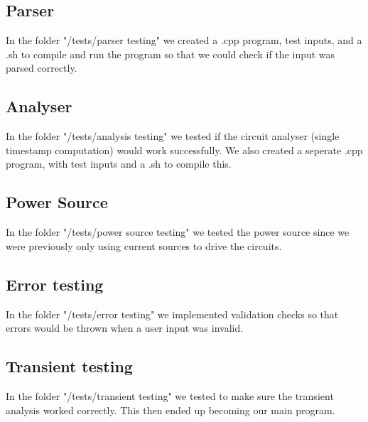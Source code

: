 \documentclass[12pt,a4paper]{article}
\begin{document}
\subsection{Parser}
In the folder "/tests/parser testing" we created a .cpp program, test inputs, and a .sh to compile and run the program so that we 
could check if the input was parsed correctly.
\subsection{Analyser}
In the folder "/tests/analysis testing" we tested if the circuit analyser (single timestamp computation) would work successfully. 
We also created a seperate .cpp program, with test inputs and a .sh to compile this.
\subsection{Power Source}
In the folder "/tests/power source testing" we tested the power source since we were previously only using current sources to 
drive the circuits.
\subsection{Error testing}
In the folder "/tests/error testing" we implemented validation checks so that errors would be thrown when a user input was invalid.
\subsection{Transient testing}
In the folder "/tests/transient testing" we tested to make sure the transient analysis worked correctly. This then ended up becoming 
our main program. 
\end{document}
